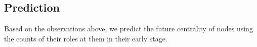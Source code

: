 









\subsection{Prediction} \label{subsection:node_prediction}

Based on the observations above, we predict the future centrality of nodes using the counts of their roles at them in their early stage. 


